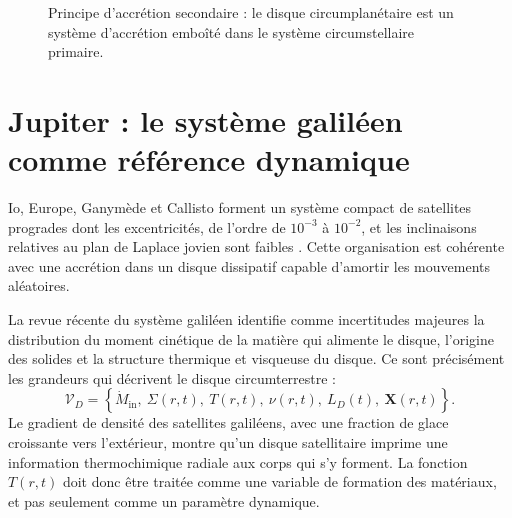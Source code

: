 \documentclass[11pt,a4paper,openany]{report}
\begin{document}
\begin{figure}[htbp]
\centering
{}
\caption{Principe d'accrétion secondaire : le disque circumplanétaire est un système d'accrétion
emboîté dans le système circumstellaire primaire.}
\label{fig:hierarchie}
\end{figure}

\section{Jupiter : le système galiléen comme référence dynamique}

Io, Europe, Ganymède et Callisto forment un système compact de satellites progrades dont les
excentricités, de l'ordre de $10^{-3}$ à $10^{-2}$, et les inclinaisons relatives au plan de
Laplace jovien sont faibles \cite{JPL}. Cette organisation est cohérente avec une accrétion dans
un disque dissipatif capable d'amortir les mouvements aléatoires.

La revue récente du système galiléen \cite{Nimmo2026} identifie comme incertitudes majeures la
distribution du moment cinétique de la matière qui alimente le disque, l'origine des solides et
la structure thermique et visqueuse du disque. Ce sont précisément les grandeurs qui décrivent
le disque circumterrestre :
\begin{equation}
\mathcal{V}_D=\left\{\dot M_{\mathrm{in}},\ \Sigma(r,t),\ T(r,t),\ \nu(r,t),\ L_D(t),\
\mathbf{X}(r,t)\right\}.
\label{eq:VD}
\end{equation}
Le gradient de densité des satellites galiléens, avec une fraction de glace croissante vers
l'extérieur, montre qu'un disque satellitaire imprime une information thermochimique radiale
aux corps qui s'y forment. La fonction $T(r,t)$ doit donc être traitée comme une variable de
formation des matériaux, et pas seulement comme un paramètre dynamique.
\end{document}
